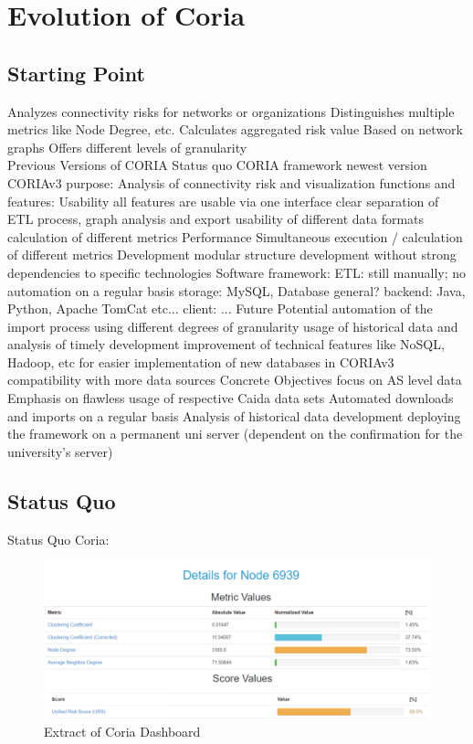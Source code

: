 \documentclass[conference]{IEEEtran}
\begin{document}
\section{Evolution of Coria}
\subsection{Starting Point}

Analyzes connectivity risks for networks or organizations 
Distinguishes multiple metrics like Node Degree, etc.
Calculates aggregated risk value
Based on network graphs
Offers different levels of granularity\\

Previous Versions of CORIA
Status quo CORIA framework	
newest version CORIAv3
purpose: Analysis of connectivity risk and visualization 
functions and features:
Usability
all features are usable via one interface 
clear separation of ETL process, graph analysis and export
usability of different data formats
calculation of different metrics 
Performance	
Simultaneous execution / calculation of different metrics
Development
modular structure
development without strong dependencies to specific technologies
Software framework:
ETL: still manually; no automation on a regular basis
storage: MySQL, Database general? 
backend: Java, Python,  Apache TomCat etc...
client: ...
Future Potential
automation of the import process
using different degrees of granularity
usage of historical data and analysis of timely development 
improvement of technical features like NoSQL, Hadoop, etc for easier implementation of new databases in CORIAv3
compatibility with more data sources
Concrete Objectives
focus on AS level data
Emphasis on flawless usage of respective Caida data sets
Automated downloads and imports on a regular basis
Analysis of historical data development
deploying the framework on a permanent uni server (dependent on the confirmation for the university’s server) 




\subsection{Status Quo}
Status Quo Coria: \\




\begin{figure}[htbp]
\centerline{\includegraphics[scale=0.4]{Graphics/coriaExtract.PNG}}
\caption{Extract of Coria Dashboard}
\label{fig}
\end{figure}
\end{document}
